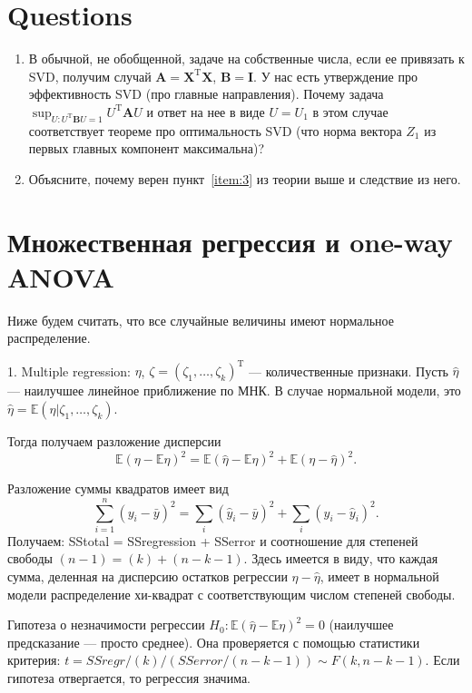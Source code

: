\documentclass[12 pt]{article}
\def\E{\mathbb{E}}
\begin{document}
\section*{Questions}
\begin{enumerate}
\item
В обычной, не обобщенной, задаче на собственные числа, если ее привязать к SVD, получим случай $\mathbf{A}=\mathbf{X}^\mathrm{T} \mathbf{X}$, $\mathbf{B} = \mathbf{I}$.
У нас есть утверждение про эффективность SVD (про главные направления). Почему задача $\sup_{U: U^\mathrm{T}\mathbf{B}U = 1} U^\mathrm{T}\mathbf{A}U$
и ответ на нее в виде $U=U_1$ в этом случае соответствует теореме про оптимальность SVD (что норма вектора $Z_1$ из первых главных компонент максимальна)?
\item
Объясните, почему верен пункт~\ref{item:3} из теории выше и следствие из него.
\end{enumerate}
\newpage
\section{Множественная регрессия и one-way ANOVA}

Ниже будем считать, что все случайные величины имеют нормальное распределение.

1. Multiple regression:  $\eta$, $\zeta=(\zeta_1,\ldots,\zeta_k)^\mathrm{T}$ --- количественные признаки.
Пусть $\hat{\eta}$ --- наилучшее линейное приближение по МНК. В случае нормальной модели, это
$\hat{\eta}=\E(\eta|\zeta_1,\ldots,\zeta_k)$.

Тогда получаем разложение дисперсии
\begin{equation}
\label{eq:pif_eta}
\E(\eta - \E\eta)^2 = \E(\hat\eta - \E\eta)^2 + \E(\eta - \hat\eta)^2.
\end{equation}

Разложение суммы квадратов имеет вид
\begin{equation}\label{eq:pif_y}
\sum_{i=1}^n(y_i-\bar{y})^2 = \sum_i(\hat{y}_i-\bar{y})^2 + \sum_i(y_i-\hat{y}_i)^2.
\end{equation}
Получаем: \mbox{SStotal}  = \mbox{SSregression} + \mbox{SSerror}
и соотношение для степеней свободы $(n-1) = (k) + (n-k-1)$. Здесь имеется в виду, что каждая сумма,
деленная на дисперсию остатков регрессии $\eta - \hat\eta$, имеет в нормальной модели распределение
хи-квадрат с соответствующим числом степеней свободы.

Гипотеза о незначимости регрессии $H_0: \E(\hat\eta - \E\eta)^2 = 0$ (наилучшее предсказание --- просто среднее). Она проверяется с помощью статистики критерия: $t = SSregr/(k) / (SSerror/(n-k-1))\sim F(k, n-k-1)$. Если гипотеза отвергается, то регрессия значима.\\
\end{document}

